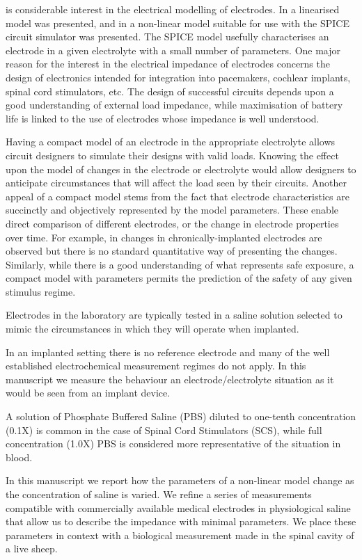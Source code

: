 \documentclass[journal, a4paper]{IEEEtran}
\begin{document}
 is considerable interest in the electrical modelling of electrodes. \cite{Cogan2008,Troy2006}
In \cite{Franks2005} a linearised model was presented, and in \cite{ScottSingle2013} a non-linear model
suitable for use with the SPICE circuit simulator was presented. The SPICE model usefully characterises an electrode in a given electrolyte with a small number of parameters.
One major reason for the interest in the electrical impedance of electrodes concerns the design of electronics intended for integration into pacemakers, cochlear implants, spinal cord stimulators, etc. The design of successful circuits depends upon a good understanding of external load impedance, while maximisation of battery life is linked to the use of electrodes whose impedance is well understood.

Having a compact model of an electrode in the appropriate electrolyte allows circuit designers to simulate their designs with valid loads. Knowing the effect upon the model of changes in the electrode or electrolyte would allow designers to anticipate circumstances that will affect the load seen by their circuits. Another appeal of a compact model stems from the fact that electrode characteristics are succinctly and objectively represented by the model parameters. These enable direct comparison of different electrodes, or the change in electrode properties over time. For example, in \cite{Kane13} changes in chronically-implanted electrodes are observed but there is no standard quantitative way of presenting the changes. Similarly, while there is a good understanding of what represents safe exposure, a compact model with parameters permits the prediction of the safety of any given stimulus regime.~\cite{Merrill05}

Electrodes in the laboratory are typically tested in a saline solution selected to mimic the circumstances in which they will operate when implanted.

In an implanted setting there is no reference electrode and many of the well established electrochemical measurement regimes do not apply. In this manuscript we measure the behaviour an electrode/electrolyte situation as it would be seen from an implant device.

A solution of Phosphate Buffered Saline (PBS) diluted to one-tenth concentration (0.1X) is common in the case of Spinal Cord Stimulators (SCS), while full concentration (1.0X) PBS is considered more representative of the situation in blood.

In this manuscript we report how the parameters of a non-linear model change as the concentration of saline is varied. We refine a series of measurements compatible with commercially available medical electrodes in physiological saline that allow us to describe the impedance with minimal parameters. We place these parameters in context with a biological measurement made in the spinal cavity of a live sheep.
\end{document}

